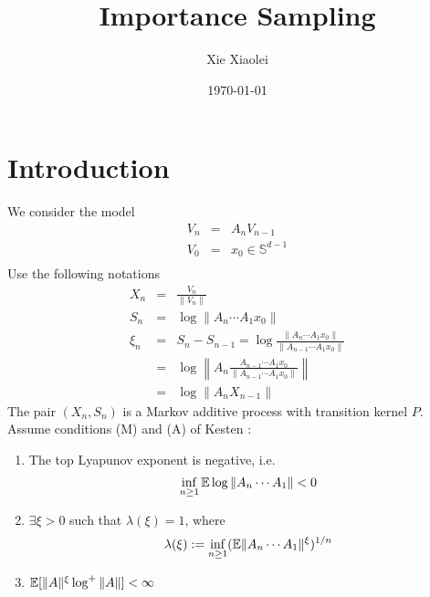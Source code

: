 \documentclass{article}
\title{Importance Sampling}
\author{Xie Xiaolei}
\date{\today}
\begin{document}
\maketitle
\section{Introduction}
We consider the model
\begin{eqnarray*}
V_n &=& A_n V_{n-1} \\
V_0 &=& x_0 \in \mathbb S^{d-1}\\
\end{eqnarray*}
Use the following notations
\begin{eqnarray*}
X_n &=& \frac{V_n}{\|V_n\|} \\
S_n &=& \log \|A_n \cdots A_1 x_0\| \\
\xi_n &=& S_n - S_{n-1} = \log\frac{\|A_n \cdots A_1 x_0\|}{\|A_{n-1} \cdots A_1 x_0\|} \\
&=& \log\left\| A_n \frac{A_{n-1} \cdots A_1 x_0}{\|A_{n-1} \cdots A_1 x_0\|} \right\|\\
&=& \log \|A_n X_{n-1}\|
\end{eqnarray*}
The pair $(X_n, S_n)$ is a Markov additive process with transition kernel $P$.
Assume conditions (M) and (A) of Kesten \cite{Kesten1973}:
\begin{enumerate}
\item The top Lyapunov exponent is negative, i.e.
  \begin{equation}
    \label{eq:neg_top_Lyapunov}
    \inf_{n \geq 1} \mathbb{E} \log \|A_n \cdots A_1\| < 0    
  \end{equation}
\item $\exists \xi > 0$ such that $\lambda(\xi) = 1$, where
  $$
  \lambda(\xi) := \inf_{n \geq 1} (\mathbb{E} \|A_n \cdots A_1\|^\xi)^{1/n}
  $$
\item $\mathbb{E}[\|A\|^\xi \log^+\|A\|] < \infty$
\end{enumerate}
\end{document}
